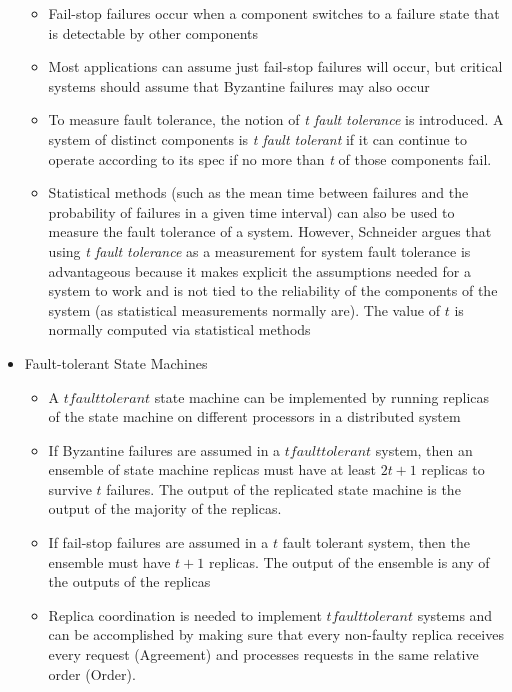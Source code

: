 \documentclass[a4paper]{article}
\begin{document}
\begin{itemize}
\begin{itemize}
\item Fail-stop failures occur when a component switches to a failure state that is detectable by other components

\item Most applications can assume just fail-stop failures will occur, but critical systems should assume that Byzantine failures may also occur

\item To measure fault tolerance, the notion of \textit{t fault tolerance} is introduced. A system of distinct components is \textit{t fault tolerant} if it can continue to operate according to its spec if no more than \textit{t} of those components fail.

\item Statistical methods (such as the mean time between failures and the probability of failures in a given time interval) can also be used to measure the fault tolerance of a system. However, Schneider argues that using \textit{t fault tolerance} as a measurement for system fault tolerance is advantageous because it makes explicit the assumptions needed for a system to work and is not tied to the reliability of the components of the system (as statistical measurements normally are). The value of $t$ is normally computed via statistical methods
\end{itemize}

\item Fault-tolerant State Machines
\begin{itemize}
\item A $t fault tolerant$ state machine can be implemented by running replicas of the state machine on different processors in a distributed system

\item If Byzantine failures are assumed in a $t fault tolerant$ system, then an ensemble of state machine replicas must have at least $2t + 1$ replicas to survive $t$ failures. The output of the replicated state machine is the output of the majority of the replicas.

\item If fail-stop failures are assumed in a $t$ fault tolerant system, then the ensemble must have $t+1$ replicas. The output of the ensemble is any of the outputs of the replicas

\item Replica coordination is needed to implement $t fault tolerant$ systems and can be accomplished by making sure that every non-faulty replica receives every request (Agreement) and processes requests in the same relative order (Order).


\end{itemize}
\end{itemize}
\end{document}
